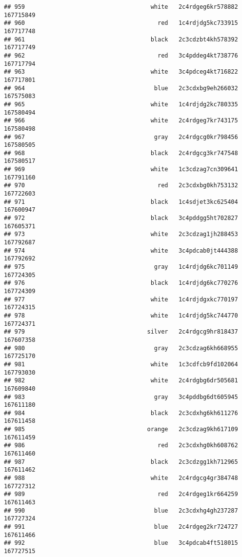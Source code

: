 \documentclass[
]{article}
\begin{document}
\begin{verbatim}
## 959                                    white   2c4rdgeg6kr578882 167715849
## 960                                      red   1c4rdjdg5kc733915 167717748
## 961                                    black   2c3cdzbt4kh578392 167717749
## 962                                      red   3c4pddeg4kt738776 167717794
## 963                                    white   3c4pdceg4kt716822 167717801
## 964                                     blue   2c3cdxbg9eh266032 167575083
## 965                                    white   1c4rdjdg2kc780335 167580494
## 966                                    white   2c4rdgeg7kr743175 167580498
## 967                                     gray   2c4rdgcg0kr798456 167580505
## 968                                    black   2c4rdgcg3kr747548 167580517
## 969                                    white   1c3cdzag7cn309641 167791160
## 970                                      red   2c3cdxbg0kh753132 167722603
## 971                                    black   1c4sdjet3kc625404 167600947
## 972                                    black   3c4pddgg5ht702827 167605371
## 973                                    white   2c3cdzag1jh288453 167792687
## 974                                    white   3c4pdcab0jt444388 167792692
## 975                                     gray   1c4rdjdg6kc701149 167724305
## 976                                    black   1c4rdjdg6kc770276 167724309
## 977                                    white   1c4rdjdgxkc770197 167724315
## 978                                    white   1c4rdjdg5kc744770 167724371
## 979                                   silver   2c4rdgcg9hr818437 167607358
## 980                                     gray   2c3cdzag6kh668955 167725170
## 981                                    white   1c3cdfcb9fd102064 167793030
## 982                                    white   2c4rdgbg6dr505681 167609840
## 983                                     gray   3c4pddbg6dt605945 167611180
## 984                                    black   2c3cdxhg6kh611276 167611458
## 985                                   orange   2c3cdzag9kh617109 167611459
## 986                                      red   2c3cdxhg0kh608762 167611460
## 987                                    black   2c3cdzgg1kh712965 167611462
## 988                                    white   2c4rdgcg4gr384748 167727312
## 989                                      red   2c4rdgeg1kr664259 167611463
## 990                                     blue   2c3cdxhg4gh237287 167727324
## 991                                     blue   2c4rdgeg2kr724727 167611466
## 992                                     blue   3c4pdcab4ft518015 167727515

\end{verbatim}
\end{document}
